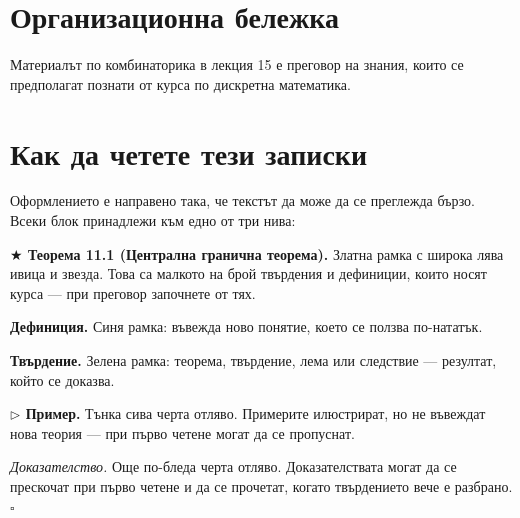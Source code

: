 \chapter*{Организационна бележка}

Материалът по комбинаторика в лекция 15 е преговор на знания, които се
предполагат познати от курса по дискретна математика.



\chapter*{Как да четете тези записки}

Оформлението е направено така, че текстът да може да се преглежда бързо. Всеки
блок принадлежи към едно от три нива:

\begin{tcolorbox}[leckeybox]
\textbf{\textcolor{keyframe}{$\bigstar$} Теорема 11.1 (Централна гранична теорема).}
Златна рамка с широка лява ивица и звезда. Това са малкото на брой твърдения и
дефиниции, които носят курса — при преговор започнете от тях.
\end{tcolorbox}

\begin{tcolorbox}[lecbox, colback=defback, colframe=defframe]
\textbf{Дефиниция.} Синя рамка: въвежда ново понятие, което се ползва по-нататък.
\end{tcolorbox}

\begin{tcolorbox}[lecbox, colback=thmback, colframe=thmframe]
\textbf{Твърдение.} Зелена рамка: теорема, твърдение, лема или следствие —
резултат, който се доказва.
\end{tcolorbox}

\begin{tcolorbox}[blanker, borderline west={1.2pt}{0pt}{exrule},
  left=4mm, top=1mm, bottom=1mm, before skip=0.7em, after skip=0.7em]
\textbf{\color{exrule}$\triangleright$ Пример.} Тънка сива черта отляво.
Примерите илюстрират, но не въвеждат нова теория — при първо четене могат да се
пропуснат.
\end{tcolorbox}

\begin{tcolorbox}[blanker, borderline west={0.6pt}{0pt}{proofrule},
  left=4mm, top=0.6mm, bottom=0.6mm, before skip=0.7em, after skip=0.7em]
\emph{Доказателство.} Още по-бледа черта отляво. Доказателствата могат да се
прескочат при първо четене и да се прочетат, когато твърдението вече е
разбрано.\hfill$\square$
\end{tcolorbox}

